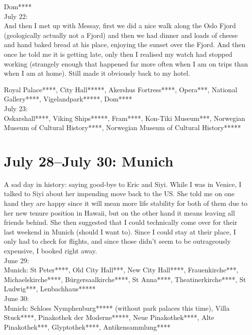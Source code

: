 Dom****\\

July 22:\\

And then I met up with Messay, first we did a nice walk along the Oslo Fjord (geologically actually not a Fjord) and then we had dinner and loads of cheese and hand baked bread at his place, enjoying the sunset over the Fjord. And then once he told me it is getting late, only then I realised my watch had stopped working (strangely enough that happened far more often when I am on trips than when I am at home).  Still made it obviously back to my hotel.

Royal Palace****, City Hall*****, Akershus Fortress****, Opera***, National Gallery****, Vigelandpark*****, Dom****\\

July 23:\\
Oskarshall****, Viking Ships*****, Fram****, Kon-Tiki Museum***, Norwegian Museum of Cultural History****, Norwegian Museum of Cultural History*****

\section{July 28--July 30: Munich}
\label{Munich2017}

A sad day in history: saying good-bye to Eric and Siyi. While I was in Venice, I talked to Siyi about her impending move back to the US. She told me on one hand they are happy since it will mean more life stability for both of them due to her new tenure position in Hawaii, but on the other hand it means leaving all friends behind. She then suggested that I could technically come over for their last weekend in Munich (should I want to). Since I could stay at their place, I only had to check for flights, and since those didn't seem to be outrageously expensive, I booked right away.\\

June 29:\\
Munich: St Peter****, Old City Hall***, New City Hall****, Frauenkirche***, Michaelskirche****, B\"urgersaalkirche****, St Anna****, Theatinerkirche****, St Ludwig***, Lenbachhaus*****\\

June 30:\\
Munich: Schloss Nymphenburg***** (without park palaces this time), Villa Stuck****, Pinakothek der Moderne*****, Neue Pinakothek****, Alte Pinakothek***, Glyptothek****, Antikensammlung****\\

